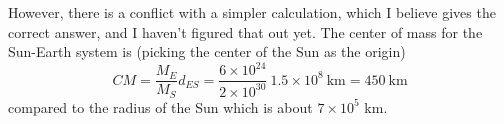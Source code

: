 \documentclass[11pt, oneside]{article}
\begin{document}
However, there is a conflict with a simpler calculation, which I believe gives the correct answer, and I haven't figured that out yet.  The center of mass for the Sun-Earth system is (picking the center of the Sun as the origin)
\[ CM = \frac{M_E}{M_S} d_{ES} = \frac{6 \times 10^{24}}{2 \times 10^{30}} \ 1.5 \times 10^8 \ \text{km} = 450 \ \text{km} \]
compared to the radius of the Sun which is about $7 \times 10^5$ km.
\end{document}
